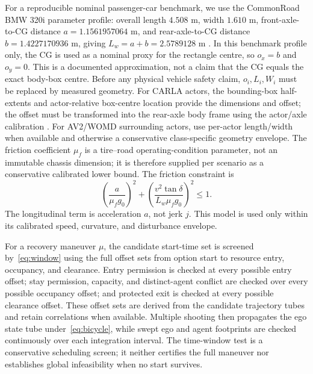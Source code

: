 \documentclass[letterpaper]{article} %
\begin{document}
For a reproducible nominal passenger-car benchmark, we use the CommonRoad
BMW 320i parameter profile: overall length $4.508$ m, width $1.610$ m,
front-axle-to-CG distance $a=1.1561957064$ m, and rear-axle-to-CG distance
$b=1.4227170936$ m, giving $L_w=a+b=2.5789128$ m
\citep{kochdumper2021verification,commonroad2025vehicleparams}. In this
benchmark profile only, the CG is used as a nominal proxy for the rectangle
centre, so $o_x=b$ and $o_y=0$. This is a documented approximation, not a
claim that the CG equals the exact body-box centre. Before any physical
vehicle safety claim, $o_i,L_i,W_i$ must be replaced by measured geometry.
For CARLA actors, the bounding-box half-extents and actor-relative box-centre
location provide the dimensions and offset; the offset must be transformed
into the rear-axle body frame using the actor/axle calibration
\citep{carla2026pythonapi}. For AV2/WOMD surrounding actors, use per-actor
length/width when available and otherwise a conservative class-specific
geometry envelope. The friction coefficient $\mu_f$ is a tire--road
operating-condition parameter, not an immutable chassis dimension; it is
therefore supplied per scenario as a conservative calibrated lower bound. The friction constraint is
\begin{equation}
\left(\frac{a}{\mu_f g_0}\right)^2+
\left(\frac{v^2\tan\delta}{L_w\mu_f g_0}\right)^2\leq1.
\label{eq:friction}
\end{equation}
The longitudinal term is acceleration $a$, not jerk $j$. This model is used
only within its calibrated speed, curvature, and disturbance envelope.

For a recovery maneuver $\mu$, the candidate start-time set is screened by~\eqref{eq:window} using the full offset sets from option start to resource entry, occupancy, and clearance. Entry permission is checked at every possible entry offset; stay permission, capacity, and distinct-agent conflict are checked over every possible occupancy offset; and protected exit is checked at every possible clearance offset. These offset sets are derived from the candidate trajectory tubes and retain correlations when available. Multiple shooting then propagates the ego state tube under~\eqref{eq:bicycle}, while swept ego and agent footprints are checked continuously over each integration interval. The time-window test is a conservative scheduling screen; it neither certifies the full maneuver nor establishes global infeasibility when no start survives.
\end{document}
